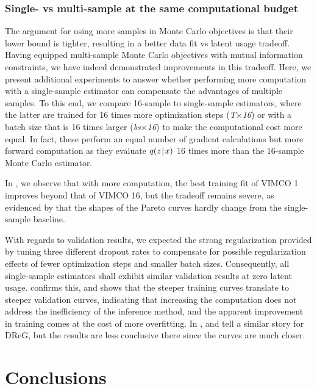 \subsubsection{Single- vs multi-sample at the same computational budget}
\label{sec:single-vs-multi-sample}

The argument for using more samples in Monte Carlo objectives is that their lower bound is tighter, resulting in a better data fit vs latent usage tradeoff.
Having equipped multi-sample Monte Carlo objectives with mutual information constraints, we have indeed demonstrated improvements in this tradeoff.
Here, we present additional experiments to answer whether performing more computation with a single-sample estimator can compensate the advantages of multiple samples.
To this end, we compare 16-sample to single-sample estimators, where the latter are trained for 16 times more optimization steps (\emph{T$\times$16}) or with a batch size that is 16 times larger (\emph{bs$\times$16}) to make the computational cost more equal.
In fact, these perform an equal number of gradient calculations but more forward computation as they evaluate $q(z\hspace{0.08em}|\hspace{0.11em} x)$ 16 times more than the 16-sample Monte Carlo estimator.

In , we observe that with more computation, the best training fit of VIMCO 1 improves beyond that of VIMCO 16, but the tradeoff remains severe, as evidenced by that the shapes of the Pareto curves hardly change from the single-sample baseline.

With regards to validation results, we expected the strong regularization provided by tuning three different dropout rates to compensate for possible regularization effects of fewer optimization steps and smaller batch sizes.
Consequently, all single-sample estimators shall exhibit similar validation results at zero latent usage.
 confirms this, and shows that the steeper training curves translate to steeper validation curves, indicating that increasing the computation does not address the inefficiency of the inference method, and the apparent improvement in training comes at the cost of more overfitting.
In ,  and  tell a similar story for DReG, but the results are less conclusive there since the curves are much closer.

\section{Conclusions}
\label{sec:conclusions}

